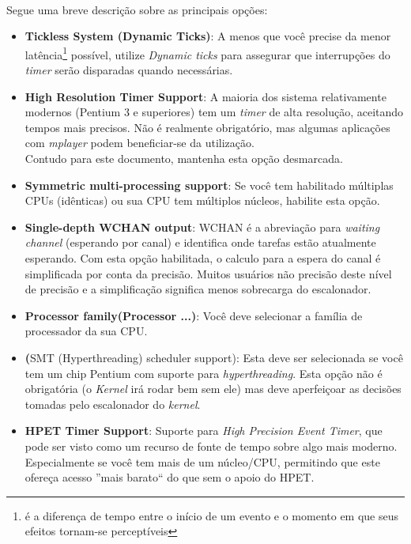 \documentclass[a4paper,10pt]{article}
\begin{document}
  \paragraph{}
    Segue uma breve descrição sobre as principais opções:
    \begin{itemize}
    \item \textbf{Tickless System (Dynamic Ticks)}: A menos que você precise da menor latência\footnote{ é a diferença de tempo entre o 
	    início de um evento e o momento em que seus efeitos tornam-se perceptíveis} possível, utilize \emph{Dynamic ticks} para assegurar 
	    que interrupções do \emph{timer} serão disparadas quando necessárias.
    \item \textbf{High Resolution Timer Support}: A maioria dos sistema relativamente modernos (Pentium 3 e superiores) tem um \emph{timer} de 
	    alta resolução, aceitando tempos mais precisos. Não é realmente obrigatório, mas algumas aplicações com \emph{mplayer} podem 
	    beneficiar-se da utilização.\\
	    Contudo para este documento, mantenha esta opção desmarcada.
    \item \textbf{Symmetric multi-processing support}: Se você tem habilitado múltiplas CPUs (idênticas) ou sua CPU tem múltiplos núcleos, 
	    habilite esta opção.
    \item \textbf{Single-depth WCHAN output}: WCHAN é a abreviação para \emph{waiting channel} (esperando por canal) e identifica onde tarefas 
	    estão atualmente esperando. Com esta opção habilitada, o calculo para a espera do canal é simplificada por conta da precisão. Muitos 
	    usuários não precisão deste nível de precisão e a simplificação significa menos sobrecarga do escalonador.
    \item \textbf{Processor family(Processor ...)}: Você deve selecionar a família de processador da sua CPU.
    \item \textbf(SMT (Hyperthreading) scheduler support): Esta deve ser selecionada se você tem um chip Pentium com suporte para 
	    \emph{hyperthreading}. Esta opção não é obrigatória (o \emph{Kernel} irá rodar bem sem ele) mas deve aperfeiçoar as decisões tomadas 
	    pelo escalonador do \emph{kernel}.
    \item \textbf{HPET Timer Support}: Suporte para \emph{High Precision Event Timer}, que pode ser visto como um recurso de 
	    fonte de tempo sobre algo mais moderno. Especialmente se você tem mais de um núcleo/CPU, permitindo que este ofereça acesso 
	    ''mais barato`` do que sem o apoio do HPET.

\end{itemize}
\end{document}
